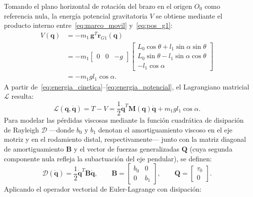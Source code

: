 Tomando el plano horizontal de rotación del brazo en el origen $O_0$ como referencia nula, la energía potencial gravitatoria $V$ se obtiene mediante el producto interno entre~\eqref{eq:marco_movil} y~\eqref{eq:pos_g1}:
\begin{equation}
    \begin{aligned}
        V(\mathbf{q}) &= -m_1\,\mathbf{g}^T\mathbf{r}_{G1}(\mathbf{q}) \\[3pt]
        &= -m_1 \begin{bmatrix} 0 & 0 & -g \end{bmatrix}
        \begin{bmatrix}
            L_0\cos\theta + l_1\sin\alpha\sin\theta \\
            L_0\sin\theta - l_1\sin\alpha\cos\theta \\
            -l_1\cos\alpha
        \end{bmatrix} \\[3pt]
        &= -m_1 g l_1\cos\alpha.
    \end{aligned}
    \label{eq:energia_potencial}
\end{equation}
A partir de~\eqref{eq:energia_cinetica}--\eqref{eq:energia_potencial}, el Lagrangiano matricial $\mathcal{L}$ resulta:
\begin{equation}
    \mathcal{L}(\mathbf{q},\dot{\mathbf{q}}) = T - V = \frac{1}{2}\dot{\mathbf{q}}^T\mathbf{M}(\mathbf{q})\dot{\mathbf{q}} + m_1 g l_1\cos\alpha.
    \label{eq:lagrangiano}
\end{equation}
Para modelar las pérdidas viscosas mediante la función cuadrática de disipación de Rayleigh $\mathcal{D}$ ---donde $b_0$ y $b_1$ denotan el amortiguamiento viscoso en el eje motriz y en el rodamiento distal, respectivamente--- junto con la matriz diagonal de amortiguamiento $\mathbf{B}$ y el vector de fuerzas generalizadas $\mathbf{Q}$ (cuya segunda componente nula refleja la subactuación del eje pendular), se definen:
\begin{equation}
    \mathcal{D}(\dot{\mathbf{q}}) = \frac{1}{2}\dot{\mathbf{q}}^T\mathbf{B}\dot{\mathbf{q}}, \qquad
    \mathbf{B} = \begin{bmatrix} b_0 & 0 \\ 0 & b_1 \end{bmatrix}, \qquad
    \mathbf{Q} = \begin{bmatrix} \tau_0 \\ 0 \end{bmatrix}.
    \label{eq:rayleigh}
\end{equation}
Aplicando el operador vectorial de Euler-Lagrange con disipación:
